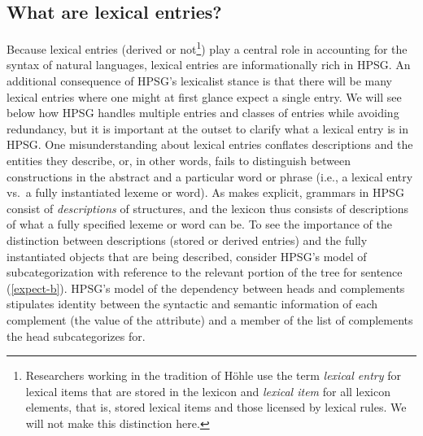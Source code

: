 \documentclass[output=paper
 	        ,biblatex
                ,babelshorthands
                ,newtxmath
                ,draftmode
                ,colorlinks, citecolor=brown
]{langscibook}
\begin{document}
\subsection{What are lexical entries?}


Because lexical entries (derived or not\footnote{%
Researchers working in the tradition of Höhle use the term \emph{lexical entry} for lexical items that are stored in the lexicon and \emph{lexical item} for all lexicon elements, that is, stored lexical items and those licensed by lexical rules. We will not make this distinction here.}) play a central role in accounting for the syntax of natural languages, lexical entries are informationally rich in HPSG. 
An additional consequence of HPSG's lexicalist stance is that there will be many lexical entries where one might at first glance expect a single entry. We will see below how HPSG handles multiple entries and classes of entries while avoiding redundancy, but it is important at the outset to clarify what a lexical entry is in HPSG. 
One misunderstanding about lexical entries conflates descriptions and the entities they describe, or, in other words, fails to distinguish between constructions in the abstract and a particular word or phrase (i.e., a lexical entry vs.\ a fully instantiated lexeme or word). 
As  makes explicit, grammars in HPSG consist of \emph{descriptions} of structures, and the lexicon thus consists of descriptions of what a fully specified lexeme or word can be. 
To see the importance of the distinction between descriptions (stored or derived entries) and the fully instantiated objects that are being described, consider HPSG's model of subcategorization with reference to the relevant portion of the tree for sentence (\ref{expect-b}). 
HPSG's model of the dependency between heads and complements stipulates identity between the syntactic and semantic information of each complement (the value of the  attribute) and a member of the list of complements the head subcategorizes for. 
\end{document}
